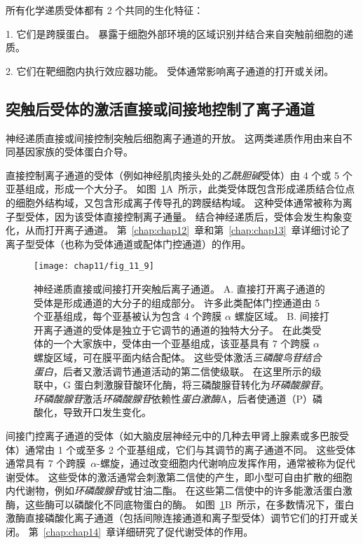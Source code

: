 所有化学递质受体都有 2 个共同的生化特征：

1. 它们是跨膜蛋白。
暴露于细胞外部环境的区域识别并结合来自突触前细胞的递质。


2. 它们在靶细胞内执行效应器功能。
受体通常影响离子通道的打开或关闭。



\subsection{突触后受体的激活直接或间接地控制了离子通道}

神经递质直接或间接控制突触后细胞离子通道的开放。
这两类递质作用由来自不同基因家族的受体蛋白介导。


直接控制离子通道的受体（例如神经肌肉接头处的\textit{乙酰胆碱}受体）由 4 个或 5 个亚基组成，形成一个大分子。
如图~\ref{fig:11_9}A~所示，此类受体既包含形成递质结合位点的细胞外结构域，又包含形成离子传导孔的跨膜结构域。
这种受体通常被称为离子型受体，因为该受体直接控制离子通量。
结合神经递质后，受体会发生构象变化，从而打开离子通道。
第~\ref{chap:chap12}~章和第~\ref{chap:chap13}~章详细讨论了离子型受体（也称为受体通道或配体门控通道）的作用。


\begin{figure}[htbp]
	\centering
	\texttt{[image: chap11/fig\_11\_9]}
	\caption{神经递质直接或间接打开突触后离子通道。
		A. 直接打开离子通道的受体是形成通道的大分子的组成部分。
		许多此类配体门控通道由 5 个亚基组成，每个亚基被认为包含 4 个跨膜 $\alpha$ 螺旋区域。
		B. 间接打开离子通道的受体是独立于它调节的通道的独特大分子。
		在此类受体的一个大家族中，受体由一个亚基组成，该亚基具有 7 个跨膜 $\alpha$ 螺旋区域，可在膜平面内结合配体。
		这些受体激活\textit{三磷酸鸟苷结合蛋白}，后者又激活调节通道活动的第二信使级联。
		在这里所示的级联中，G 蛋白刺激腺苷酸环化酶，将三磷酸腺苷转化为\textit{环磷酸腺苷}。
		\textit{环磷酸腺苷}激活\textit{环磷酸腺苷}依赖性\textit{蛋白激酶}A，后者使通道（P）磷酸化，导致开口发生变化。}
	\label{fig:11_9}
\end{figure}


间接门控离子通道的受体（如大脑皮层神经元中的几种去甲肾上腺素或多巴胺受体）通常由 1 个或至多 2 个亚基组成，它们与其调节的离子通道不同。
这些受体通常具有 7 个跨膜~$\alpha$-螺旋，通过改变细胞内代谢响应发挥作用，通常被称为促代谢受体。
这些受体的激活通常会刺激第二信使的产生，即小型可自由扩散的细胞内代谢物，例如\textit{环磷酸腺苷}或甘油二酯。
在这些第二信使中的许多能激活蛋白激酶，这些酶可以磷酸化不同底物蛋白的酶。
如图~\ref{fig:11_9}B~所示，在多数情况下，蛋白激酶直接磷酸化离子通道（包括间隙连接通道和离子型受体）调节它们的打开或关闭。
第~\ref{chap:chap14}~章详细研究了促代谢受体的作用。


